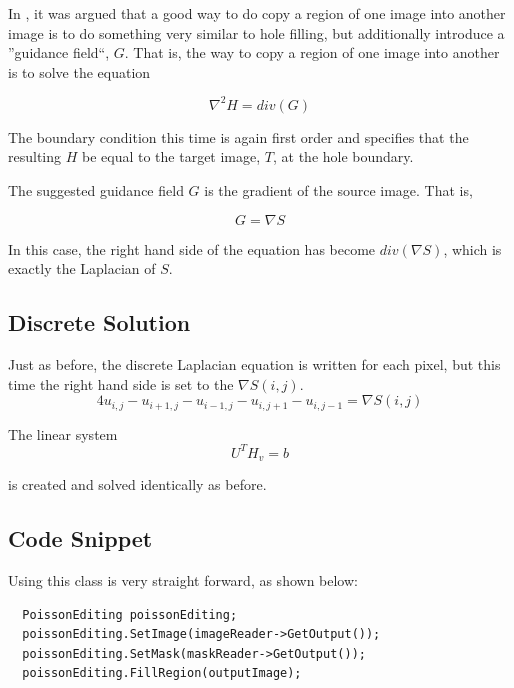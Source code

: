 \documentclass{InsightArticle}
\begin{document}
In \cite{PoissonImageEditing}, it was argued that a good way to do copy a region of one image into another image is to do something very similar to hole filling, but additionally introduce a ''guidance field``, $G$. That is, the way to copy a region of one image into another is to solve the equation

\begin{equation}
\nabla^2 H = div(G)
\end{equation}

The boundary condition this time is again first order and specifies that the resulting $H$ be equal to the target image, $T$, at the hole boundary.

The suggested guidance field $G$ is the gradient of the source image. That is,

\begin{equation}
G = \nabla S
\end{equation}

In this case, the right hand side of the equation has become $div(\nabla S)$, which is exactly the Laplacian of $S$.

\subsection{Discrete Solution}
Just as before, the discrete Laplacian equation is written for each pixel, but this time the right hand side is set to the $\nabla S(i,j)$.
\begin{equation}
\label{eqn:DiscreteLaplacian}
4 u_{i,j} - u_{i+1,j} - u_{i-1,j} - u_{i,j+1} - u_{i,j-1} = \nabla S(i,j)
\end{equation}

The linear system 
\begin{equation}
 U^T H_v = b
\end{equation}

is created and solved identically as before.

\subsection{Code Snippet}

Using this class is very straight forward, as shown below:

\begin{verbatim}
  PoissonEditing poissonEditing;
  poissonEditing.SetImage(imageReader->GetOutput());
  poissonEditing.SetMask(maskReader->GetOutput());
  poissonEditing.FillRegion(outputImage);
\end{verbatim}



\end{document}
